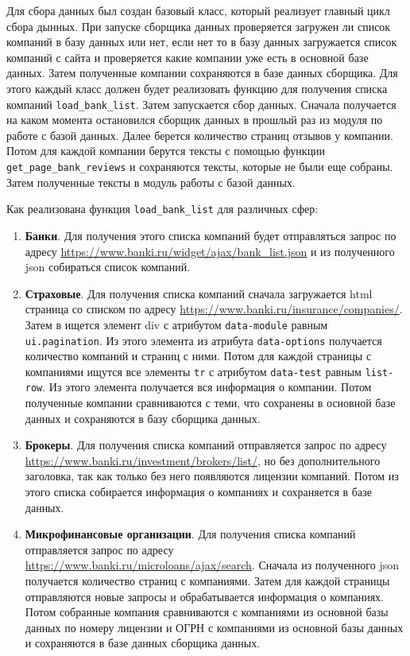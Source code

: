 \documentclass[PI, VKR]{HSEUniversity}
\begin{document}
Для сбора данных был создан базовый класс, который реализует главный цикл сбора дынных. При запуске сборщика данных проверяется загружен ли список компаний в базу данных или нет, если нет то в базу данных загружается список компаний с сайта и проверяется какие компании уже есть в основной базе данных. Затем полученные компании сохраняются в базе данных сборщика. Для этого каждый класс должен будет реализовать функцию для получения списка компаний \texttt{load\_bank\_list}. Затем запускается сбор данных. Сначала получается на каком момента остановился сборщик данных в прошлый раз из модуля по работе с базой данных. Далее берется количество страниц отзывов у компании. Потом для каждой компании берутся тексты с помощью функции \texttt{get\_page\_bank\_reviews} и сохраняются тексты, которые не были еще собраны. Затем полученные тексты в модуль работы с базой данных.

Как реализована функция \texttt{load\_bank\_list} для различных сфер:
\begin{enumerate}
\item \textbf{Банки}. Для получения этого списка компаний будет отправляться запрос по адресу \url{https://www.banki.ru/widget/ajax/bank\_list.json} и из полученного json собираться список компаний.
\item \textbf{Страховые}. Для получения списка компаний сначала загружается html страница со списком по адресу \url{https://www.banki.ru/insurance/companies/}. Затем в ищется элемент div с атрибутом \texttt{data-module} равным \texttt{ui.pagination}. Из этого элемента из атрибута \texttt{data-options} получается количество компаний и страниц с ними. Потом для каждой страницы с компаниями ищутся все элементы \texttt{tr} с атрибутом \texttt{data-test} равным \texttt{list-row}. Из этого элемента получается вся информация о компании. Потом полученные компании сравниваются с теми, что сохранены в основной базе данных и сохраняются в базу сборщика данных.
\item \textbf{Брокеры}. Для получения списка компаний отправляется запрос по адресу \url{https://www.banki.ru/investment/brokers/list/}, но без дополнительного заголовка, так как только без него появляются лицензии компаний. Потом из этого списка собирается информация о компаниях и сохраняется в базе данных.
\item \textbf{Микрофинансовые организации}. Для получения списка компаний отправляется запрос по адресу \url{https://www.banki.ru/microloans/ajax/search}. Сначала из полученного json получается количество страниц с компаниями. Затем для каждой страницы отправляются новые запросы и обрабатывается информация о компаниях. Потом собранные компания сравниваются с компаниями из основной базы данных по номеру лицензии и ОГРН с компаниями из основной базы данных и сохраняются в базе данных сборщика данных.
\end{enumerate}
\end{document}
